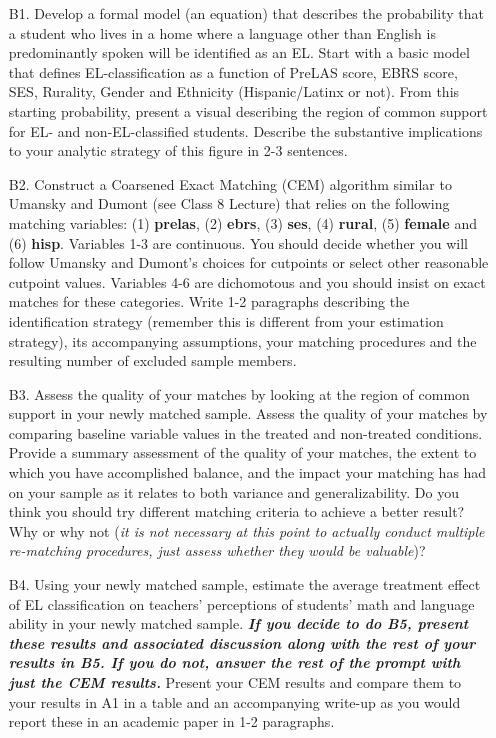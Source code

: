 \documentclass[a4paper, 11pt]{article}
\begin{document}
\begin{enumerate}
	\item[B1.] Develop a formal model (an equation) that describes the probability that a student who lives in a home where a language other than English is predominantly spoken will be identified as an EL. Start with a basic model that defines EL-classification as a function of PreLAS score, EBRS score, SES, Rurality, Gender and Ethnicity (Hispanic/Latinx or not). From this starting probability, present a visual describing the region of common support for EL- and non-EL-classified students. Describe the substantive implications to your analytic strategy of this figure in 2-3 sentences.
	\item[B2.] Construct a Coarsened Exact Matching (CEM) algorithm similar to Umansky and Dumont (see Class 8 Lecture) that relies on the following matching variables: (1) \textbf{prelas}, (2) \textbf{ebrs}, (3) \textbf{ses}, (4) \textbf{rural}, (5) \textbf{female} and (6) \textbf{hisp}. Variables 1-3 are continuous. You should decide whether you will follow Umansky and Dumont's choices for cutpoints or select other reasonable cutpoint values. Variables 4-6 are dichomotous and you should insist on exact matches for these categories. Write 1-2 paragraphs describing the identification strategy (remember this is different from your estimation strategy), its accompanying assumptions, your matching procedures and the resulting number of excluded sample members.
	\item[B3.] Assess the quality of your matches by looking at the region of common support in your newly matched sample. Assess the quality of your matches by comparing baseline variable values in the treated and non-treated conditions. Provide a summary assessment of the quality of your matches, the extent to which you have accomplished balance, and the impact your matching has had on your sample as it relates to both variance and generalizability. Do you think you should try different matching criteria to achieve a better result? Why or why not (\textit{it is not necessary at this point to actually conduct multiple re-matching procedures, just assess whether they would be valuable})?
	\item[B4.] Using your newly matched sample, estimate the average treatment effect of EL classification on teachers' perceptions of students' math and language ability in your newly matched sample. \textbf{\textit{If you decide to do B5, present these results and associated discussion along with the rest of your results in B5. If you do not, answer the rest of the prompt with just the CEM results.}} Present your CEM results and compare them to your results in A1 in a table and an accompanying write-up as you would report these in an academic paper in 1-2 paragraphs. 

\end{enumerate}
\end{document}
